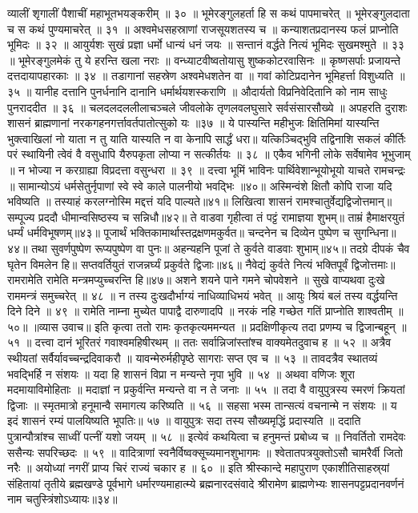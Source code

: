व्यालीं शृगालीं पैशाचीं महाभूतभयङ्करीम् ॥ ३० ॥
भूमेरङ्गुलहर्ता हि स कथं पापमाचरेत् ॥
भूमेरङ्गुलदाता च स कथं पुण्यमाचरेत् ॥ ३१ ॥
अश्वमेधसहस्राणां राजसूयशतस्य च ॥
कन्याशतप्रदानस्य फलं प्राप्नोति भूमिदः ॥ ३२ ॥
आयुर्यशः सुखं प्रज्ञा धर्मो धान्यं धनं जयः ॥
सन्तानं वर्द्धते नित्यं भूमिदः सुखमश्मुते ॥ ३३ ॥
भूमेरङ्गुलमेकं तु ये हरन्ति खला नराः ॥
वन्ध्याटवीष्वतोयासु शुष्ककोटरवासिनः ॥
कृष्णसर्पाः प्रजायन्ते दत्तदायापहारकाः ॥ ३४ ॥
तडागानां सहस्रेण अश्वमेधशतेन वा ॥
गवां कोटिप्रदानेन भूमिहर्त्ता विशुध्यति ॥ ३५ ॥
यानीह दत्तानि पुनर्धनानि दानानि धर्मार्थयशस्कराणि ॥
औदार्यतो विप्रनिवेदितानि को नाम साधुः पुनराददीत ॥ ३६ ॥
चलदलदललीलाचञ्चले जीवलोके तृणलवलघुसारे सर्वसंसारसौख्ये ॥
अपहरति दुराशः शासनं ब्राह्मणानां नरकगहनगर्त्तावर्तपातोत्सुको यः ॥३७ ॥
ये पास्यन्ति महीभुजः क्षितिमिमां यास्यन्ति भुक्त्वाखिलां नो याता न तु याति यास्यति न वा केनापि सार्द्धं धरा॥
यत्किञ्चिद्भुवि तद्विनाशि सकलं कीर्तिः परं स्थायिनी त्वेवं वै वसुधापि यैरुपकृता लोप्या न सत्कीर्तयः ॥ ३८ ॥
एकैव भगिनी लोके सर्वेषामेव भूभुजाम् ॥
न भोज्या न करग्राह्या विप्रदत्ता वसुन्धरा ॥ ३९ ॥
दत्त्वा भूमिं भाविनः पार्थिवेशान्भूयोभूयो याचते रामचन्द्रः ॥
सामान्योऽयं धर्मसेतुर्नृपाणां स्वे स्वे काले पालनीयो भवद्भिः ॥४०॥
अस्मिन्वंशे क्षितौ कोपि राजा यदि भविष्यति ॥
तस्याहं करलग्नोस्मि मद्दत्तं यदि पाल्यते॥४१॥
लिखित्वा शासनं रामश्चातुर्वेद्यद्विजोत्तमान्॥
सम्पूज्य प्रददौ धीमान्वसिष्ठस्य च सन्निधौ॥४२॥
ते वाडवा गृहीत्वा तं पट्टं रामाज्ञया शुभम्॥
ताम्रं हैमाक्षरयुतं धर्म्यं धर्मविभूषणम्॥४३॥
पूजार्थं भक्तिकामार्थास्तद्रक्षणमकुर्वत॥
चन्दनेन च दिव्येन पुष्पेण च सुगन्धिना॥४४॥
तथा सुवर्णपुष्पेण रूप्यपुष्पेण वा पुनः॥
अहन्यहनि पूजां ते कुर्वते वाडवाः शुभाम्॥४५॥
तदग्रे दीपकं चैव घृतेन विमलेन हि॥
सप्तवर्तियुतं राजन्नर्घ्यं प्रकुर्वते द्विजाः॥४६॥
नैवेद्यं कुर्वते नित्यं भक्तिपूर्वं द्विजोत्तमाः॥
रामरामेति रामेति मन्त्रमप्युच्चरन्ति हि॥४७॥
अशने शयने पाने गमने चोपवेशने ॥
सुखे वाप्यथवा दुःखे राममन्त्रं समुच्चरेत् ॥ ४८ ॥
न तस्य दुःखदौर्भाग्यं नाधिव्याधिभयं भवेत् ॥
आयुः श्रियं बलं तस्य वर्द्धयन्ति दिने दिने ॥ ४९ ॥
रामेति नाम्ना मुच्येत पापाद्वै दारुणादपि ॥
नरकं नहि गच्छेत गतिं प्राप्नोति शाश्वतीम् ॥ ५०॥
॥व्यास उवाच॥
इति कृत्वा ततो रामः कृतकृत्यममन्यत ॥
प्रदक्षिणीकृत्य तदा प्रणम्य च द्विजान्बहून् ॥ ५१ ॥
दत्त्वा दानं भूरितरं गवाश्वमहिषीरथम् ॥
ततः सर्वान्निजांस्तांश्च वाक्यमेतदुवाच ह ॥ ५२ ॥
अत्रैव स्थीयतां सर्वैर्यावच्चन्द्रदिवाकरौ ॥
यावन्मेरुर्महीपृष्ठे सागराः सप्त एव च ॥ ५३ ॥
तावदत्रैव स्थातव्यं भवद्भिर्हि न संशयः ॥
यदा हि शासनं विप्रा न मन्यन्ते नृपा भुवि ॥ ५४ ॥
अथवा वणिजः शूरा मदमायाविमोहिताः ॥
मदाज्ञां न प्रकुर्वन्ति मन्यन्ते वा न ते जनाः ॥ ५५ ॥
तदा वै वायुपुत्रस्य स्मरणं क्रियतां द्विजाः ॥
स्मृतमात्रो हनूमान्वै समागत्य करिष्यति ॥ ५६ ॥
सहसा भस्म तान्सत्यं वचनान्मे न संशयः ॥
य इदं शासनं रम्यं पालयिष्यति भूपतिः॥ ५७ ॥
वायुपुत्रः सदा तस्य सौख्यमृद्धिं प्रदास्यति ॥
ददाति पुत्रान्पौत्रांश्च साध्वीं पत्नीं यशो जयम् ॥ ५८ ॥
इत्येवं कथयित्वा च हनुमन्तं प्रबोध्य च ॥
निवर्तितो रामदेवः ससैन्यः सपरिच्छदः ॥ ५९ ॥
वादित्राणां स्वनैर्विष्वक्सूच्यमानशुभागमः ॥
श्वेतातपत्रयुक्तोऽसौ चामरैर्वी जितो नरैः ॥
अयोध्यां नगरीं प्राप्य चिरं राज्यं चकार ह ॥ ६० ॥
इति श्रीस्कान्दे महापुराण एकाशीतिसाहस्र्यां संहितायां तृतीये ब्रह्मखण्डे पूर्वभागे धर्मारण्यमाहात्म्ये ब्रह्मनारदसंवादे श्रीरामेण ब्राह्मणेभ्यः शासनपट्टप्रदानवर्णनं नाम चतुस्त्रिंशोऽध्यायः॥३४॥

